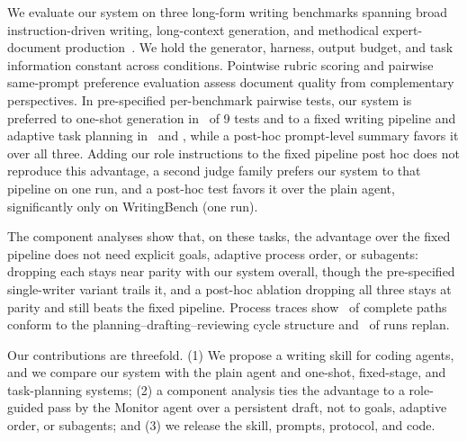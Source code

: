 We evaluate our system on three long-form writing benchmarks spanning broad instruction-driven writing, long-context generation, and methodical expert-document production~\citep{wu2026writingbench,que2024hellobench,malaviya2025dolomites}.
We hold the generator, harness, output budget, and task information constant across conditions.
Pointwise rubric scoring and pairwise same-prompt preference evaluation assess document quality from complementary perspectives.
In pre-specified per-benchmark pairwise tests, our system is preferred to one-shot generation in \PooledFourOneHolmCellsTotal\ of 9 tests and to a fixed writing pipeline and adaptive task planning in \PooledFourTwoHolmCellsTotal\ and \PooledFourThreeHolmCellsTotal, while a post-hoc prompt-level summary favors it over all three.
Adding our role instructions to the fixed pipeline post hoc does not reproduce this advantage, a second judge family prefers our system to that pipeline on one run, and a post-hoc test favors it over the plain agent, significantly only on WritingBench (one run).

The component analyses show that, on these tasks, the advantage over the fixed pipeline does not need explicit goals, adaptive process order, or subagents: dropping each stays near parity with our system overall, though the pre-specified single-writer variant trails it, and a post-hoc ablation dropping all three stays at parity and still beats the fixed pipeline.
Process traces show \AfourCycleCompliantRate\ of complete paths conform to the planning--drafting--reviewing cycle structure and \AfourReviewingToPlanningRate\ of runs replan.

Our contributions are threefold.
(1) We propose a writing skill for coding agents, and we compare our system with the plain agent and one-shot, fixed-stage, and task-planning systems; (2) a component analysis ties the advantage to a role-guided pass by the Monitor agent over a persistent draft, not to goals, adaptive order, or subagents; and (3) we release the skill, prompts, protocol, and code.
